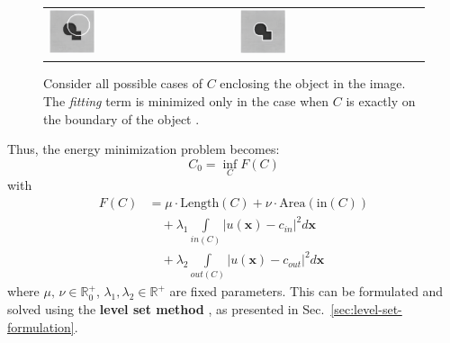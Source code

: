 \documentclass[journal]{IEEEtran}
\begin{document}
\begin{figure}[!t]
\begin{tabular}{@{}>{\centering\arraybackslash} m{} @{} >{\centering\arraybackslash} m{} @{}}
        \includegraphics[width=0.25\textwidth,height=0.25\textheight,keepaspectratio]{images/fitting-problem-lower-left.png} & \includegraphics[width=0.25\textwidth,height=0.25\textheight,keepaspectratio]{images/fitting-problem-lower-right.png} \\
    \end{tabular}
    \caption{Consider all possible cases of $C$ enclosing the object in the image. The \emph{fitting} term is minimized only in the case when $C$ is exactly on the boundary of the object \cite{ChanVese}.}
    \label{tab2:fitting-problem}
\end{figure}

\noindent Thus, the energy minimization problem becomes:
\begin{equation}
    C_0 = \inf_{C} F(C)
\end{equation}
\noindent with
\begin{equation}\label{eq:energy-functional}
    \begin{aligned}
        F(C) & = \mu \cdot \textrm{Length}(C) + \nu \cdot \textrm{Area}(\textrm{in}(C))                         \\
             & \quad + \lambda_1 \int\limits_{\scriptstyle in(C)} \left| u(\bm{x}) - c_{in} \right|^2 d\bm{x}   \\
             & \quad + \lambda_2 \int\limits_{\scriptstyle out(C)} \left| u(\bm{x}) - c_{out} \right|^2 d\bm{x}
    \end{aligned}
\end{equation}
\noindent where $\mu, \, \nu \in \mathbb{R}_0^+$, $\lambda_1, \lambda_2 \in \mathbb{R}^+$ are fixed parameters.
This can be formulated and solved using the \textbf{level set method} \cite{Osher1988}, as presented in Sec.~\ref{sec:level-set-formulation}.
\end{document}
